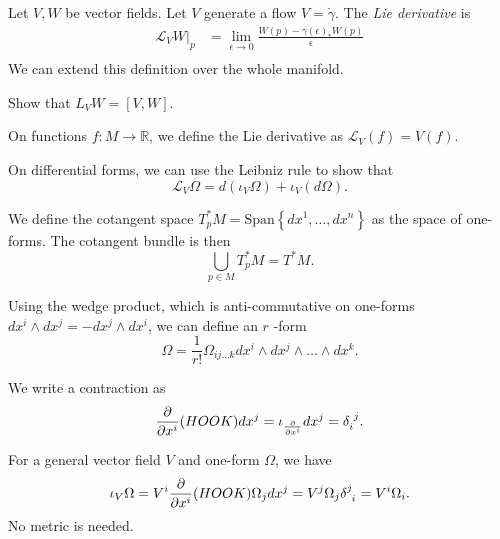 
\begin{definition}
  Let $V, W$ be vector fields. Let $V$ generate a flow $V = \dot{\gamma}$. The \emph{Lie derivative} is
  \begin{align}
    \mathcal{L}_V W \rvert_p &= \lim_{\epsilon \to 0} \frac{W(p) - \gamma(\epsilon)_* W(p)}{\epsilon} \\
  \end{align}
  We can extend this definition over the whole manifold.
\end{definition}
\begin{exercise}
  Show that $L_V W = [V, W]$.
\end{exercise}
\begin{definition}[]
  On functions $f \colon M \to \mathbb{R}$, we define the Lie derivative as $\mathcal{L}_V(f) = V(f)$.
\end{definition}
On differential forms, we can use the Leibniz rule to show that
\begin{equation}
  \mathcal{L}_V \Omega = d(\iota_V \Omega) + \iota_V (d\Omega).
\end{equation}
\begin{definition}[]
  We define the cotangent space $T^*_p M = \text{Span}\left\{dx^1, \dots, dx^n\right\}$ as the space of one-forms.
  The cotangent bundle is then
  \begin{equation}
    \bigcup_{p\in M} T^*_p M = T^* M.
  \end{equation}
\end{definition}
Using the wedge product, which is anti-commutative on one-forms $dx^{i} \wedge dx^{j} = -dx^{j} \wedge dx^{i}$, we can define an $r$ -form 
\begin{equation}
  \Omega = \frac{1}{r!} \Omega_{ij \dots k} dx^{i} \wedge dx^{j} \wedge \dots \wedge dx^k.
\end{equation}
\begin{definition}[contraction]
  We write a contraction as
  \begin{equation}
    \frac{\partial }{\partial x^{i}} (HOOK) dx^{j} = \iota_{\frac{\partial }{\partial x^{i}}} dx^{j} = \delta\indices{_{i}^{j}}.
  \end{equation}
\end{definition}
For a general vector field $V$ and one-form $ \Omega$, we have
\begin{equation}
  \iota_V \Omega = V^{i} \frac{\partial }{\partial x^{i}} (HOOK) \Omega_j dx^{j} = V^{j} \Omega_{j} \delta\indices{^{j}_{i}} = V^{i} \Omega_{i}.
\end{equation}
No metric is needed.

